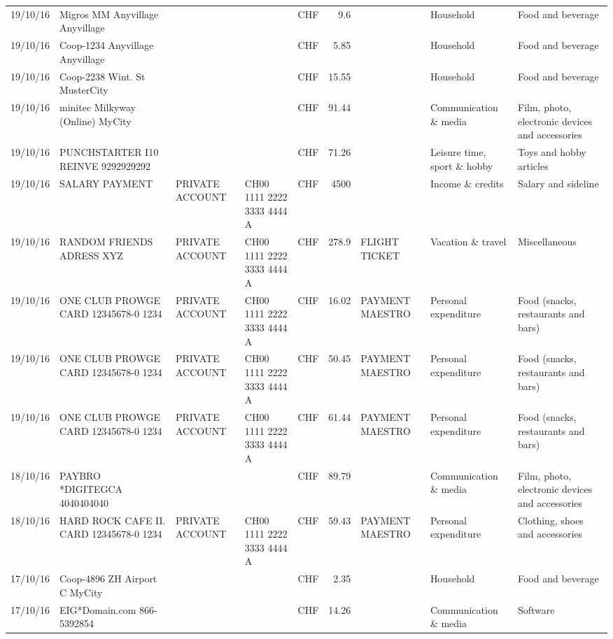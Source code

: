 \begin{landscape}
\begin{table}[h]
\begin{center}
\begin{tabular}{rllllrlll}
		19/10/16 & Migros MM Anyvillage    Anyvillage &       &       & CHF   & 9.6   &       & Household & Food and beverage \\
		19/10/16 & Coop-1234 Anyvillage    Anyvillage &       &       & CHF   & 5.85  &       & Household & Food and beverage \\
		19/10/16 & Coop-2238 Wint. St       MusterCity &       &       & CHF   & 15.55 &       & Household & Food and beverage \\
		19/10/16 & minitec Milkyway (Online) MyCity &       &       & CHF   & 91.44 &       & Communication \& media & Film, photo, electronic devices and accessories \\
		19/10/16 & PUNCHSTARTER I10 REINVE   9292929292 &       &       & CHF   & 71.26 &       & Leisure time, sport \& hobby & Toys and hobby articles \\
		19/10/16 & SALARY PAYMENT & PRIVATE ACCOUNT & CH00 1111 2222 3333 4444 A & CHF   & 4500  &       & Income \& credits & Salary and sideline \\
		19/10/16 & RANDOM FRIENDS ADRESS XYZ & PRIVATE ACCOUNT & CH00 1111 2222 3333 4444 A & CHF   & 278.9 & FLIGHT TICKET & Vacation \& travel & Miscellaneous \\
		19/10/16 & ONE CLUB PROWGE CARD 12345678-0 1234 & PRIVATE ACCOUNT & CH00 1111 2222 3333 4444 A & CHF   & 16.02 & PAYMENT MAESTRO & Personal expenditure & Food (snacks, restaurants and bars) \\
		19/10/16 & ONE CLUB PROWGE CARD 12345678-0 1234 & PRIVATE ACCOUNT & CH00 1111 2222 3333 4444 A & CHF   & 50.45 & PAYMENT MAESTRO & Personal expenditure & Food (snacks, restaurants and bars) \\
		19/10/16 & ONE CLUB PROWGE CARD 12345678-0 1234 & PRIVATE ACCOUNT & CH00 1111 2222 3333 4444 A & CHF   & 61.44 & PAYMENT MAESTRO & Personal expenditure & Food (snacks, restaurants and bars) \\
		18/10/16 & PAYBRO *DIGITEGCA      4040404040 &       &       & CHF   & 89.79 &       & Communication \& media & Film, photo, electronic devices and accessories \\
		18/10/16 & HARD ROCK CAFE II. CARD 12345678-0 1234 & PRIVATE ACCOUNT & CH00 1111 2222 3333 4444 A & CHF   & 59.43 & PAYMENT MAESTRO & Personal expenditure & Clothing, shoes and accessories \\
		17/10/16 & Coop-4896 ZH Airport C   MyCity &       &       & CHF   & 2.35  &       & Household & Food and beverage \\
		17/10/16 & EIG*Domain.com           866-5392854 &       &       & CHF   & 14.26 &       & Communication \& media & Software \\

\end{tabular}
\end{center}
\end{table}
\end{landscape}
